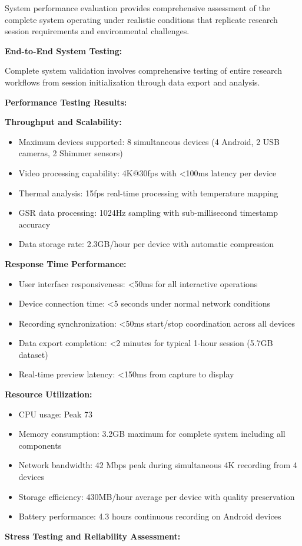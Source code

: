 \documentclass[12pt,a4paper]{report}
\begin{document}
System performance evaluation provides comprehensive assessment of the complete system operating under realistic
conditions that replicate research session requirements and environmental challenges.

\textbf{End-to-End System Testing:}

Complete system validation involves comprehensive testing of entire research workflows from session initialization
through data export and analysis.

\textbf{Performance Testing Results:}

\textbf{Throughput and Scalability:}

\begin{itemize}
\item Maximum devices supported: 8 simultaneous devices (4 Android, 2 USB cameras, 2 Shimmer sensors)
\item Video processing capability: 4K@30fps with <100ms latency per device
\item Thermal analysis: 15fps real-time processing with temperature mapping
\item GSR data processing: 1024Hz sampling with sub-millisecond timestamp accuracy
\item Data storage rate: 2.3GB/hour per device with automatic compression

\end{itemize}
\textbf{Response Time Performance:}

\begin{itemize}
\item User interface responsiveness: <50ms for all interactive operations
\item Device connection time: <5 seconds under normal network conditions
\item Recording synchronization: <50ms start/stop coordination across all devices
\item Data export completion: <2 minutes for typical 1-hour session (5.7GB dataset)
\item Real-time preview latency: <150ms from capture to display

\end{itemize}
\textbf{Resource Utilization:}

\begin{itemize}
\item CPU usage: Peak 73%
\item Memory consumption: 3.2GB maximum for complete system including all components
\item Network bandwidth: 42 Mbps peak during simultaneous 4K recording from 4 devices
\item Storage efficiency: 430MB/hour average per device with quality preservation
\item Battery performance: 4.3 hours continuous recording on Android devices

\end{itemize}
\textbf{Stress Testing and Reliability Assessment:}
\end{document}
